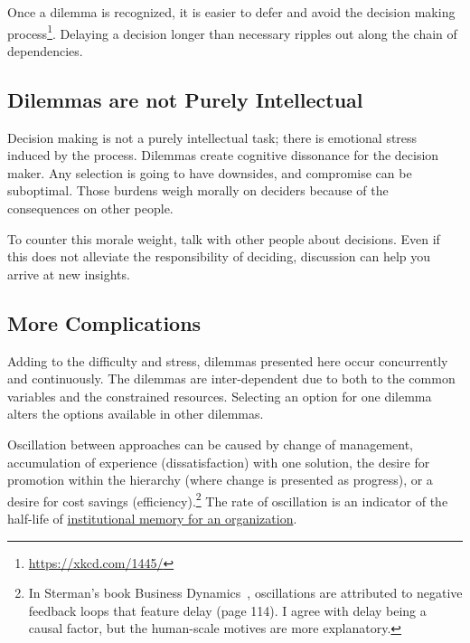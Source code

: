 Once a dilemma is recognized, it is easier to defer and avoid the  decision making process\footnote{\href{https://xkcd.com/1445/}{https://xkcd.com/1445/}}. Delaying a decision longer than necessary ripples out along the chain of dependencies. 

\subsection*{Dilemmas are not Purely Intellectual}
Decision making is not a purely intellectual task; there is emotional stress induced by the process. Dilemmas create cognitive dissonance for the decision maker. Any selection is going to have downsides, and compromise can be suboptimal. Those burdens weigh morally on deciders because of the consequences on other people.

To counter this morale weight, talk with other people about decisions. 
Even if this does not alleviate the responsibility of deciding, discussion can help you arrive at new insights. 

\subsection*{More Complications}
Adding to the difficulty and stress, dilemmas presented here occur concurrently and continuously. The dilemmas are inter-dependent due to both to the common variables and the constrained resources.
Selecting an option for one dilemma alters the options available in other dilemmas.

Oscillation between approaches can be caused by change of management, accumulation of experience (dissatisfaction) with one solution, the desire for promotion within the hierarchy (where change is presented as progress), or a desire for cost savings (efficiency).\footnote{In Sterman's book Business Dynamics~\cite{2000_Sterman}, oscillations are attributed to negative feedback loops that feature delay (page 114). I agree with delay being a causal factor, but the human-scale motives
are more explanatory.} The rate of oscillation is an indicator of the half-life of \href{https://en.wikipedia.org/wiki/Institutional_memory}{institutional memory for an organization}. 

